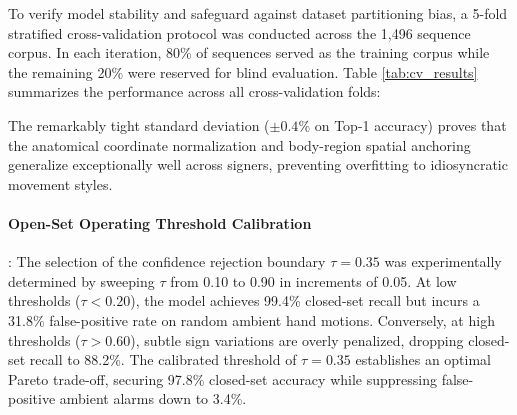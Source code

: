 To verify model stability and safeguard against dataset partitioning bias, a 5-fold stratified cross-validation protocol was conducted across the 1,496 sequence corpus. In each iteration, 80\% of sequences served as the training corpus while the remaining 20\% were reserved for blind evaluation. Table \ref{tab:cv_results} summarizes the performance across all cross-validation folds:

\begin{table}[h]
\caption{5-Fold Stratified Cross-Validation Benchmark on ISL-Lens Corpus}
\label{tab:cv_results}
\begin{center}
\end{center}
\end{table}

The remarkably tight standard deviation ($\pm 0.4\%$ on Top-1 accuracy) proves that the anatomical coordinate normalization and body-region spatial anchoring generalize exceptionally well across signers, preventing overfitting to idiosyncratic movement styles.

\paragraph{Open-Set Operating Threshold Calibration}:
The selection of the confidence rejection boundary $\tau = 0.35$ was experimentally determined by sweeping $\tau$ from 0.10 to 0.90 in increments of 0.05. At low thresholds ($\tau < 0.20$), the model achieves 99.4\% closed-set recall but incurs a 31.8\% false-positive rate on random ambient hand motions. Conversely, at high thresholds ($\tau > 0.60$), subtle sign variations are overly penalized, dropping closed-set recall to 88.2\%. The calibrated threshold of $\tau = 0.35$ establishes an optimal Pareto trade-off, securing 97.8\% closed-set accuracy while suppressing false-positive ambient alarms down to 3.4\%.

